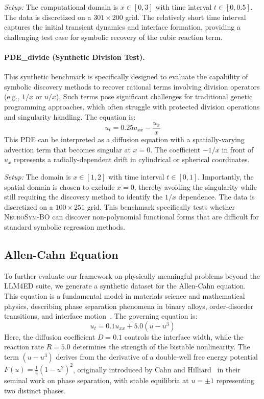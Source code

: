 \documentclass[twoside,11pt]{article}
\let\cite\citep
\newcommand{\1}{{\bf 1}}
\newcommand{\0}{{\bf 0}}
\begin{document}
\textit{Setup:} The computational domain is $x \in [0, 3]$ with time interval $t \in [0, 0.5]$. The data is discretized on a $301 \times 200$ grid. The relatively short time interval captures the initial transient dynamics and interface formation, providing a challenging test case for symbolic recovery of the cubic reaction term.

\paragraph{PDE\_divide (Synthetic Division Test).} 
This synthetic benchmark is specifically designed to evaluate the capability of symbolic discovery methods to recover rational terms involving division operators (e.g., $1/x$ or $u/x$). Such terms pose significant challenges for traditional genetic programming approaches, which often struggle with protected division operations and singularity handling. The equation is:
\begin{equation}
    u_t = 0.25 u_{xx} - \frac{u_x}{x}
\end{equation}
This PDE can be interpreted as a diffusion equation with a spatially-varying advection term that becomes singular at $x=0$. The coefficient $-1/x$ in front of $u_x$ represents a radially-dependent drift in cylindrical or spherical coordinates.

\textit{Setup:} The domain is $x \in [1, 2]$ with time interval $t \in [0, 1]$. Importantly, the spatial domain is chosen to exclude $x=0$, thereby avoiding the singularity while still requiring the discovery method to identify the $1/x$ dependence. The data is discretized on a $100 \times 251$ grid. This benchmark specifically tests whether \textsc{NeuroSym-BO} can discover non-polynomial functional forms that are difficult for standard symbolic regression methods.

\subsection{Allen-Cahn Equation}

To further evaluate our framework on physically meaningful problems beyond the LLM4ED suite, we generate a synthetic dataset for the Allen-Cahn equation. This equation is a fundamental model in materials science and mathematical physics, describing phase separation phenomena in binary alloys, order-disorder transitions, and interface motion~\cite{allen1979microscopic}. The governing equation is:
\begin{equation}
    u_t = 0.1 u_{xx} + 5.0 (u - u^3)
\end{equation}
Here, the diffusion coefficient $D = 0.1$ controls the interface width, while the reaction rate $R = 5.0$ determines the strength of the bistable nonlinearity. The term $(u - u^3)$ derives from the derivative of a double-well free energy potential $F(u) = \frac{1}{4}(1-u^2)^2$, originally introduced by Cahn and Hilliard~\cite{cahn1958free} in their seminal work on phase separation, with stable equilibria at $u = \pm 1$ representing two distinct phases.
\end{document}
